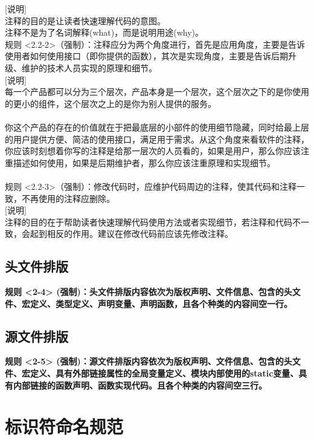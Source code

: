\documentclass[UTF8,a4paper,12pt]{article}
\begin{document}
	[说明]\\
	注释的目的是让读者快速理解代码的意图。\\
	注释不是为了名词解释(what)，而是说明用途(why)。\\
	
	规则 <2.2-2>（强制）：注释应分为两个角度进行，首先是应用角度，主要是告诉使用者如何使用接口（即你提供的函数），其次是实现角度，主要是告诉后期升级、维护的技术人员实现的原理和细节。\\
	
	[说明]\\
	每一个产品都可以分为三个层次，产品本身是一个层次，这个层次之下的是你使用的更小的组件，这个层次之上的是你为别人提供的服务。\\
	\\
	你这个产品的存在的价值就在于把最底层的小部件的使用细节隐藏，同时给最上层的用户提供方便、简洁的使用接口，满足用于需求。从这个角度来看软件的注释，你应该时刻想着你写的注释是给那一层次的人员看的，如果是用户，那么你应该注重描述如何使用，如果是后期维护者，那么你应该注重原理和实现细节。\\
	\\
	规则 <2.2-3>（强制）：修改代码时，应维护代码周边的注释，使其代码和注释一致，不再使用的注释应删除。\\
	
	[说明]\\
	注释的目的在于帮助读者快速理解代码使用方法或者实现细节，若注释和代码不一致，会起到相反的作用。建议在修改代码前应该先修改注释。
	
	\subsection{头文件排版}
	\textbf{规则 <2-4> (强制)：头文件排版内容依次为版权声明、文件信息、包含的头文件、宏定义、类型定义、声明变量、声明函数，且各个种类的内容间空一行。}
	
	\subsection{源文件排版}
	\textbf{规则 <2-5> (强制)：源文件排版内容依次为版权声明、文件信息、包含的头文件、宏定义、具有外部链接属性的全局变量定义、模块内部使用的static变量、具有内部链接的函数声明、函数实现代码。且各个种类的内容间空三行。}
	\newpage
		
	\section{标识符命名规范}
	\newpage
	
\end{document}

